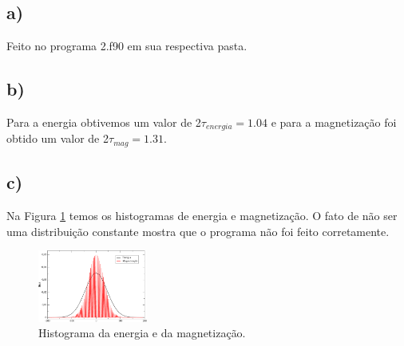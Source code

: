 \documentclass[a4wide]{report}
\begin{document}
\subsection*{a)}
Feito no programa 2.f90 em sua respectiva pasta.
\subsection*{b)}
Para a energia obtivemos um valor de  2$\tau_{energia} = 1.04$ e para a magnetização foi obtido um valor de 2$\tau_{mag} = 1.31$.

\subsection*{c)}
Na Figura \ref{2c} temos os histogramas de energia e magnetização. O fato de não ser uma distribuição constante mostra que o programa não foi feito corretamente.
\begin{figure}[!htb]
\centering
\includegraphics[width=0.32\textwidth]{mag2.pdf}
\caption{Histograma da energia e da magnetização.}
\label{2c}
\end{figure}
\end{document}

